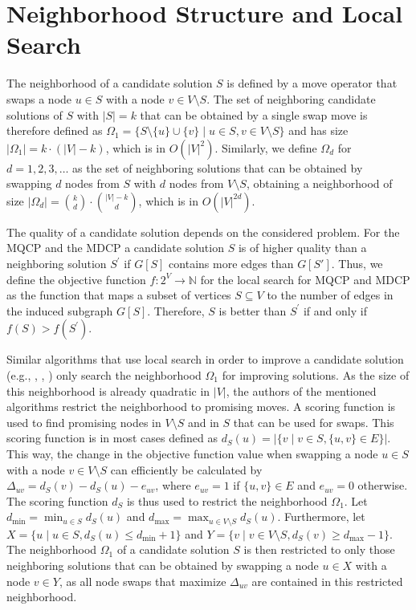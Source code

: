 \documentclass[draft,final]{vutinfth} %
\begin{document}
\section{Neighborhood Structure and Local Search} \label{sec:neighborhood-structure}

The neighborhood of a candidate solution $S$ is defined by a move operator that swaps a node $u \in S$ with a node $v \in V \setminus S$. The set of neighboring candidate solutions of $S$ with $|S| = k$ that can be obtained by a single swap move is therefore defined as $\Omega_1 = \{ S \setminus \{u\} \cup \{v\} \mid u \in S, v \in V \setminus S \}$ and has size $|\Omega_1| = k \cdot (|V|-k)$, which is in $O(|V|^2)$. Similarly, we define $\Omega_d$ for $d=1,2,3,\dots$ as the set of neighboring solutions that can be obtained by swapping $d$ nodes from $S$ with $d$ nodes from $V \setminus S$, obtaining a neighborhood of size $|\Omega_d| = \binom{k}{d} \cdot \binom{|V|-k}{d}$, which is in $O(|V|^{2d})$. 


The quality of a candidate solution depends on the considered problem. For the MQCP and the MDCP a candidate solution $S$ is of higher quality than a neighboring solution $S^\prime$ if $G[S]$ contains more edges than $G[S']$. Thus, we define the objective function $f \colon 2^V \rightarrow \mathbb{N}$ for the local search for MQCP and MDCP as the function that maps a subset of vertices $S \subseteq V$ to the number of edges in the induced subgraph $G[S]$. Therefore, $S$ is better than $S^\prime$ if and only if $f(S) > f(S^\prime)$. 

Similar algorithms that use local search in order to improve a candidate solution (e.g.,  \cite{chen_nuqclq_2021}, \cite{djeddi_extension_2019}, \cite{zhou_opposition-based_2020}) only search the neighborhood $\Omega_1$ for improving solutions. As the size of this neighborhood is already quadratic in $|V|$, the authors of the mentioned algorithms restrict the neighborhood to promising moves. A scoring function is used to find promising nodes in $V \setminus S$ and in $S$ that can be used for swaps. This scoring function is in most cases defined as $d_S(u) = |\{v \mid v \in S, \{u,v\} \in E \}|$. This way, the change in the objective function value when swapping a node $u \in S$ with a node $v \in V \setminus S$ can efficiently be calculated by $\Delta_{uv} = d_S(v) - d_S(u) - e_{uv}$, where $e_{uv} = 1$ if $\{u,v\} \in E$ and $e_{uv} = 0$ otherwise. 
The scoring function $d_S$ is thus used to restrict the neighborhood $\Omega_1$. 
Let $d_{\min} = \min_{u \in S} d_S(u)$ and $d_{\max} = \max_{u \in V \setminus S} d_S(u)$.
 Furthermore, let $X = \{ u \mid u \in S, d_S(u) \leq d_{\min} + 1 \}$ and $Y = \{ v \mid v \in V \setminus S, d_S(v) \geq d_{\max} - 1 \}$. The neighborhood $\Omega_1$ of a candidate solution $S$ is then restricted to only those neighboring solutions that can be obtained by swapping a node $u \in X$ with a node $v \in Y$, as all node swaps that maximize $\Delta_{uv}$ are contained in this restricted neighborhood. 
\end{document}
